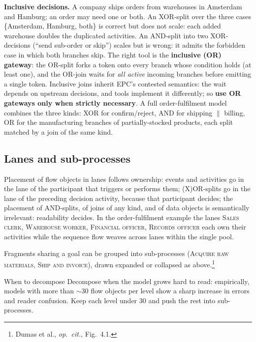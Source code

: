 \textbf{Inclusive decisions.} A company ships orders from warehouses in Amsterdam and Hamburg; an order may need one or both. An XOR-split over the three cases \{Amsterdam, Hamburg, both\} is correct but does not scale: each added warehouse doubles the duplicated activities. An AND-split into two XOR-decisions (``send sub-order or skip'') scales but is wrong: it admits the forbidden case in which both branches skip. The right tool is the \textbf{inclusive (OR) gateway}: the OR-split forks a token onto every branch whose condition holds (at least one), and the OR-join waits for \emph{all active} incoming branches before emitting a single token. Inclusive joins inherit EPC's contested semantics: the wait depends on upstream decisions, and tools implement it differently; so \textbf{use OR gateways only when strictly necessary}. A full order-fulfilment model combines the three kinds: XOR for confirm/reject, AND for shipping $\|$ billing, OR for the manufacturing branches of partially-stocked products, each split matched by a join of the same kind.

\subsection{Lanes and sub-processes}

Placement of flow objects in lanes follows ownership: events and activities go in the lane of the participant that triggers or performs them; (X)OR-splits go in the lane of the preceding decision activity, because that participant decides; the placement of AND-splits, of joins of any kind, and of data objects is semantically irrelevant: readability decides. In the order-fulfilment example the lanes \textsc{Sales clerk}, \textsc{Warehouse worker}, \textsc{Financial officer}, \textsc{Records officer} each own their activities while the sequence flow weaves across lanes within the single pool.

Fragments sharing a goal can be grouped into sub-processes (\textsc{Acquire raw materials}, \textsc{Ship and invoice}), drawn expanded or collapsed as above.\footnote{Dumas et al., \emph{op.~cit.}, Fig.~4.1.}

\begin{notebox}{When to decompose}
Decompose when the model grows hard to read: empirically, models with more than $\sim$30 flow objects per level show a sharp increase in errors and reader confusion. Keep each level under 30 and push the rest into sub-processes.
\end{notebox}

